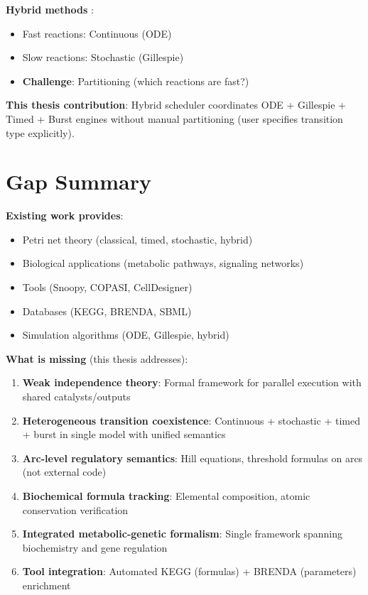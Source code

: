 \textbf{Hybrid methods} \citep{Haseltine2002}:

\begin{itemize}
    \item Fast reactions: Continuous (ODE)
    \item Slow reactions: Stochastic (Gillespie)
    \item \textbf{Challenge}: Partitioning (which reactions are fast?)
\end{itemize}

\textbf{This thesis contribution}: Hybrid scheduler coordinates ODE + Gillespie + Timed + Burst engines without manual partitioning (user specifies transition type explicitly).

\section{Gap Summary}
\label{sec:gap-summary}

\textbf{Existing work provides}:

\begin{itemize}
    \item[$\checkmark$] Petri net theory (classical, timed, stochastic, hybrid)
    \item[$\checkmark$] Biological applications (metabolic pathways, signaling networks)
    \item[$\checkmark$] Tools (Snoopy, COPASI, CellDesigner)
    \item[$\checkmark$] Databases (KEGG, BRENDA, SBML)
    \item[$\checkmark$] Simulation algorithms (ODE, Gillespie, hybrid)
\end{itemize}

\textbf{What is missing} (this thesis addresses):

\begin{enumerate}
    \item \textbf{Weak independence theory}: Formal framework for parallel execution with shared catalysts/outputs
    \item \textbf{Heterogeneous transition coexistence}: Continuous + stochastic + timed + burst in single model with unified semantics
    \item \textbf{Arc-level regulatory semantics}: Hill equations, threshold formulas on arcs (not external code)
    \item \textbf{Biochemical formula tracking}: Elemental composition, atomic conservation verification
    \item \textbf{Integrated metabolic-genetic formalism}: Single framework spanning biochemistry and gene regulation
    \item \textbf{Tool integration}: Automated KEGG (formulas) + BRENDA (parameters) enrichment
\end{enumerate}

